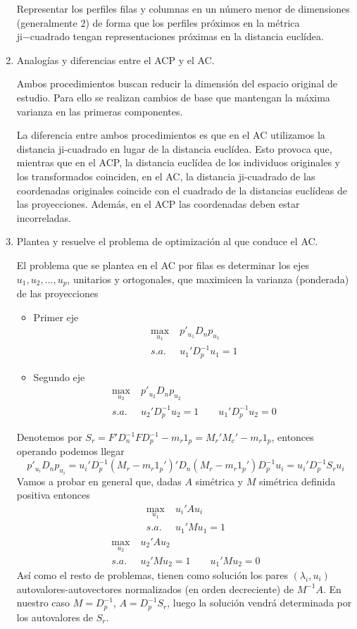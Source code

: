 \documentclass[twoside]{article}
\begin{document}
\begin{enumerate}
Representar los perfiles filas y columnas en un número menor
de dimensiones (generalmente 2) de forma que los perfiles próximos en la métrica ji−cuadrado tengan representaciones próximas en la distancia euclídea.


\item Analogías y diferencias entre el ACP y el AC.

Ambos procedimientos buscan reducir la dimensión del espacio original de estudio. Para ello se realizan cambios de base que mantengan la máxima varianza en las primeras componentes.  

La diferencia entre ambos procedimientos es que en el AC utilizamos la distancia ji-cuadrado en lugar de la distancia euclídea. Esto provoca que, mientras que en el ACP, la distancia euclídea de los individuos originales y los transformados coinciden, en el AC, la distancia ji-cuadrado de las coordenadas originales coincide con el cuadrado de la distancias euclídeas de las proyecciones. Además, en el ACP las coordenadas deben estar incorreladas. 

\item Plantea y resuelve el problema de optimización al que conduce el AC. 

El problema que se plantea en el AC por filas es determinar los ejes $u_1, u_2,\dotsc, u_p$, unitarios y ortogonales, que maximicen la varianza (ponderada) de las proyecciones
\begin{itemize}
\item Primer eje
\begin{align*}
\max_{u_1} &\; p'_{u_1}D_np_{u_1} \\
s.a.&\; u_1'D_p^{-1}u_1 = 1
\end{align*}
\item Segundo eje
\begin{align*}
\max_{u_2} &\; p'_{u_2}D_n p_{u_2} \\
s.a.& \;u_2'D_p^{-1}u_2 = 1 \qquad u_1'D_p^{-1}u_2 = 0 
\end{align*}
\end{itemize}

Denotemos por $S_r = F'D_n^{-1}FD_p^{-1}-m_r1_p = M_r'M_c'-m_r1_p$, entonces operando podemos llegar
$$
p'_{u_i}D_np_{u_i} = u_i'D_p^{-1}(M_r -m_r1_p')'D_n(M_r -m_r1_p')D_p^{-1}u_i = u_i'D_p^{-1}S_ru_i
$$
Vamos a probar en general que, dadas $A$ simétrica y $M$ simétrica definida positiva entonces
\begin{align*}
\max_{u_1} &\;  u_i'Au_i \\
s.a.&\;  u_1'Mu_1 = 1
\end{align*}
\begin{align*}
\max_{u_2} &\;  u_2'Au_2 \\
s.a.& \; u_2'Mu_2 = 1 \qquad u_1'Mu_2 = 0 
\end{align*}
Así como el resto de problemas, tienen como solución los pares $(\lambda_i,u_i)$ autovalores-autovectores normalizados (en orden decreciente) de $M^{-1}A$. En nuestro caso $M=D_p^{-1}$, $A = D^{-1}_p S_r$, luego la solución vendrá determinada por los autovalores de $S_r$.


\end{enumerate}
\end{document}
